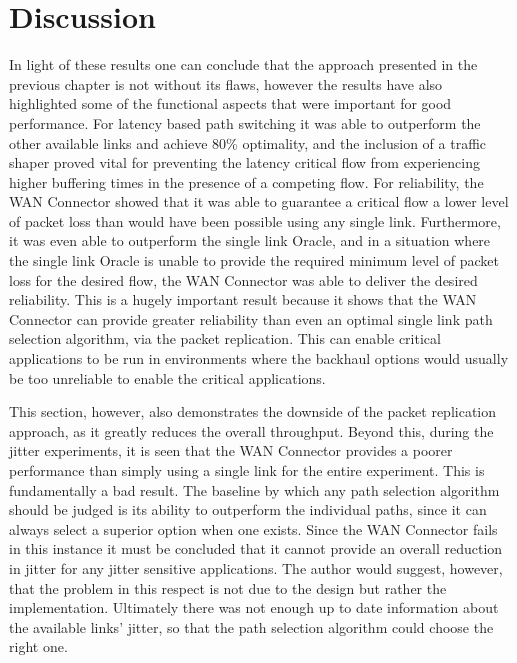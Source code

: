 \section{Discussion}

In light of these results one can conclude that the approach presented in the previous chapter is not without its flaws, however the results have also highlighted some of the functional aspects that were important for good performance. For latency based path switching it was able to outperform the other available links and achieve 80\% optimality, and the inclusion of a traffic shaper proved vital for preventing the latency critical flow from experiencing higher buffering times in the presence of a competing flow. For reliability, the WAN Connector showed that it was able to guarantee a critical flow a lower level of packet loss than would have been possible using any single link. Furthermore, it was even able to outperform the single link Oracle, and in a situation where the single link Oracle is unable to provide the required minimum level of packet loss for the desired flow, the WAN Connector was able to deliver the desired reliability. This is a hugely important result because it shows that the WAN Connector can provide greater reliability than even an optimal single link path selection algorithm, via the packet replication. This can enable critical applications to be run in environments where the backhaul options would usually be too unreliable to enable the critical applications.

This section, however, also demonstrates the downside of the packet replication approach, as it greatly reduces the overall throughput. Beyond this, during the jitter experiments, it is seen that the WAN Connector provides a poorer performance than simply using a single link for the entire experiment. This is fundamentally a bad result. The baseline by which any path selection algorithm should be judged is its ability to outperform the individual paths, since it can always select a superior option when one exists. Since the WAN Connector fails in this instance it must be concluded that it cannot provide an overall reduction in jitter for any jitter sensitive applications. The author would suggest, however, that the problem in this respect is not due to the design but rather the implementation. Ultimately there was not enough up to date information about the available links' jitter, so that the path selection algorithm could choose the right one.


